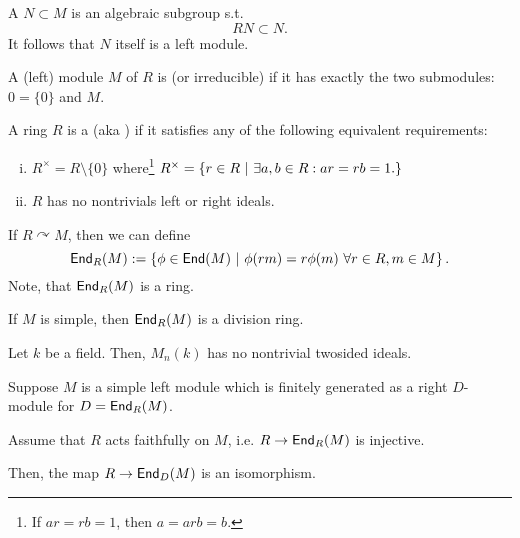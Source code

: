 \begin{definition}
	A  $N \subset M$ is an algebraic subgroup s.t.
	\[ RN \subset N. \]
	It follows that $N$ itself is a left module.
\end{definition}
\begin{definition}
	A (left) module $M$ of $R$ is  (or irreducible) if it has exactly the two submodules: $0 = \{0\}$ and $M$.
\end{definition}
\begin{definition}
	A ring $R$ is a  (aka ) if it satisfies any of the following equivalent requirements:
	\begin{enumerate}[(i)]
		\item $R^\times = R \setminus \{0\} $
		where\footnote{If $ar = rb = 1$, then $a = arb = b$.} $R^\times = \left\lbrace r \in R ~ | ~ \exists a,b \in R: ar = rb = 1.\right\rbrace$
		\item $R$ has no nontrivials left or right ideals.
	\end{enumerate}
\end{definition}
\begin{definition}
If $R \curvearrowright M$, then we can define
\[ \textsf{End}_R(M) := \left\lbrace\phi \in \textsf{End}(M) ~ | ~ \phi(rm) = r\phi(m) ~\forall r\in R, m \in M\right\rbrace. \]
Note, that $\textsf{End}_R(M)$ is a ring.
\end{definition}
\begin{lemma}
	If $M$ is simple, then $\textsf{End}_R(M)$ is a division ring.
\end{lemma}
\begin{lemma}
	Let $k$ be a field. Then, $M_n(k)$ has no nontrivial twosided ideals.
\end{lemma}
\begin{theorem}
Suppose $M$ is a simple left module which is finitely generated as a right $D$-module for $D = \textsf{End}_R(M)$.

Assume that $R$ acts faithfully on $M$, i.e. $R \overset{}{\rightarrow} \textsf{End}_R(M)$ is injective.

Then, the map $R \overset{}{\rightarrow} \textsf{End}_D(M)$ is an isomorphism.
\end{theorem}